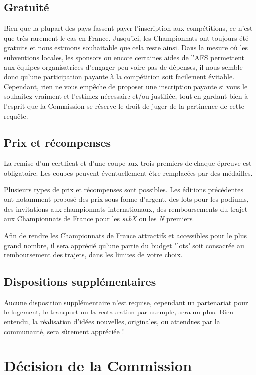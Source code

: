 \documentclass[a4paper,12pt]{scrartcl}
\begin{document}
\subsection*{Gratuité}
Bien que la plupart des pays fassent payer l'inscription aux compétitions, ce n'est que très rarement le cas en France. Jusqu'ici, les Championnats ont toujours été gratuits et nous estimons souhaitable que cela reste ainsi. Dans la mesure où les subventions locales, les sponsors ou encore certaines aides de l'AFS permettent aux équipes organisatrices d'engager peu voire pas de dépenses, il nous semble donc qu'une participation payante à la compétition soit facilement évitable. Cependant, rien ne vous empêche de proposer une inscription payante si vous le souhaitez vraiment et l'estimez nécessaire et/ou justifiée, tout en gardant bien à l'esprit que la Commission se réserve le droit de juger de la pertinence de cette requête.


\subsection*{Prix et récompenses}
La remise d'un certificat et d'une coupe aux trois premiers de chaque épreuve est obligatoire. Les coupes peuvent éventuellement être remplacées par des médailles.

Plusieurs types de prix et récompenses sont possibles. Les éditions précédentes ont notamment proposé des prix sous forme d'argent, des lots pour les podiums, des invitations aux championnats internationaux, des remboursements du trajet aux Championnats de France pour les \emph{subX} ou les \emph{N} premiers.

Afin de rendre les Championnats de France attractifs et accessibles pour le plus grand nombre, il sera apprécié qu'une partie du budget "lots" soit consacrée au remboursement des trajets, dans les limites de votre choix.


\subsection*{Dispositions supplémentaires}

Aucune disposition supplémentaire n'est requise, cependant un partenariat pour le logement, le transport ou la restauration par exemple, sera un plus.
Bien entendu, la réalisation d'idées nouvelles, originales, ou attendues par la communauté, sera sûrement appréciée !


\section*{Décision de la Commission}
\end{document}
